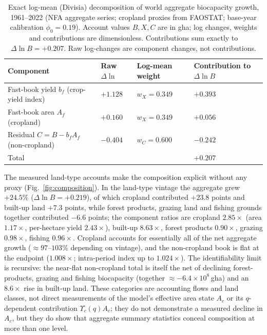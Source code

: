 \documentclass[preprint,12pt,authoryear]{elsarticle}
\newcommand{\Ups}{\Upsilon_c}
\begin{document}
\begin{table}[!htbp]
\centering\small
\caption{Exact log-mean (Divisia) decomposition of world aggregate biocapacity growth, 1961--2022 (NFA aggregate series; cropland proxies from FAOSTAT; base-year calibration $\phi_0=0.19$). Account values $B,X,C$ are in gha; log changes, weights and contributions are dimensionless. Contributions sum exactly to $\Delta\ln B=+0.207$. Raw log-changes are component changes, not contributions.}
\label{tab:divisia}
\begin{tabularx}{\textwidth}{X l l l}
\toprule
Component & Raw $\Delta\ln$ & Log-mean weight & Contribution to $\Delta\ln B$ \\
\midrule
Fast-book yield $b_f$ (crop-yield index) & $+1.128$ & $w_X=0.349$ & $+0.393$ \\
Fast-book area $A_f$ (cropland) & $+0.160$ & $w_X=0.349$ & $+0.056$ \\
Residual $C=B-b_fA_f$ (non-cropland) & $-0.404$ & $w_C=0.600$ & $-0.242$ \\
\midrule
Total & & & $+0.207$ \\
\bottomrule
\end{tabularx}
\end{table}

The measured land-type accounts make the composition explicit without any proxy (Fig.~\ref{fig:composition}). In the land-type vintage the aggregate grew $+24.5\%$ ($\Delta\ln B=+0.219$), of which cropland contributed $+23.8$ points and built-up land $+7.3$ points, while forest products, grazing land and fishing grounds together contributed $-6.6$ points; the component ratios are cropland $2.85\times$ (area $1.17\times$, per-hectare yield $2.43\times$), built-up $8.63\times$, forest products $0.90\times$, grazing $0.98\times$, fishing $0.96\times$. Cropland accounts for essentially all of the net aggregate growth ($\approx97$--$103\%$ depending on vintage), and the non-cropland book is flat at the endpoint ($1.008\times$; intra-period index up to $1.024\times$). The identifiability limit is recursive: the near-flat non-cropland total is itself the net of declining forest-products, grazing and fishing biocapacity (together $\approx-6.4\times10^{8}$\,gha) and an $8.6\times$ rise in built-up land. These categories are accounting flows and land classes, not direct measurements of the model's effective area state $A_c$ or its $q$-dependent contribution $\Ups(q)A_c$; they do not demonstrate a measured decline in $A_c$, but they do show that aggregate summary statistics conceal composition at more than one level.
\end{document}
